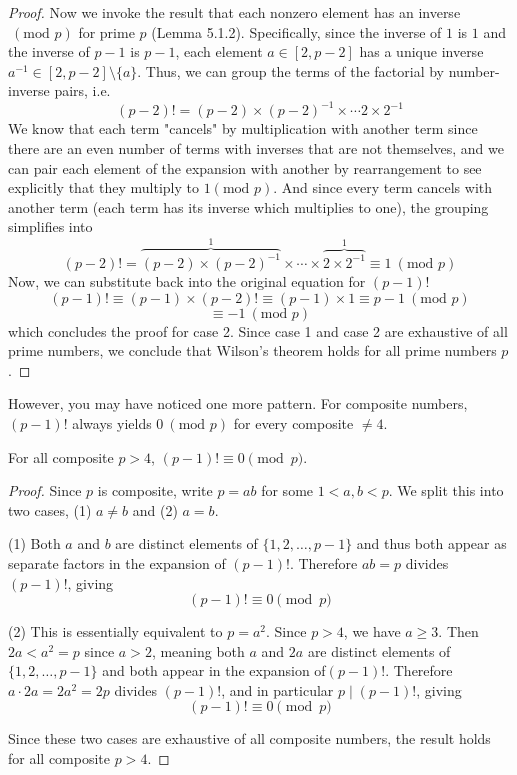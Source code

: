 \begin{proof}
Now we invoke the result that each nonzero element has an inverse $~(\text{mod }p)$ for prime $p$ (Lemma 5.1.2). Specifically, since the inverse of $1$ is $1$ and the inverse of $p-1$ is $p-1$, each element $a \in [2, p-2]$ has a unique inverse $a^{-1} \in [2, p-2] \setminus \{ a \}$. Thus, we can group the terms of the factorial by number-inverse pairs, i.e.
\[
(p-2)! = (p-2) \times (p-2)^{-1} \times \cdots 2 \times 2^{-1}
\]
We know that each term "cancels" by multiplication with another term since there are an even number of terms with inverses that are not themselves, and we can pair each element of the expansion with another by rearrangement to see explicitly that they multiply to $1 (\text{mod }p)$. And since every term cancels with another term (each term has its inverse which multiplies to one), the grouping simplifies into
\[
(p-2)! = \overbrace{(p-2) \times (p-2)^{-1}}^{1} \times \cdots \times \overbrace{2 \times 2^{-1}}^{1} \equiv 1 ~(\text{mod }p)
\]
Now, we can substitute back into the original equation for $(p-1)!$
\[
(p-1)! \equiv (p-1) \times (p-2)! \equiv (p-1) \times 1 \equiv p-1 ~(\text{mod }p)
\]
\[
\equiv -1 ~(\text{mod }p)
\]
which concludes the proof for case 2. Since case 1 and case 2 are exhaustive of all prime numbers, we conclude that Wilson's theorem holds for all prime numbers $p$.
\end{proof}

However, you may have noticed one more pattern. For composite numbers, $(p-1)!$ always yields $0 ~(\text{mod }p)$ for every composite $\neq 4$.

\begin{corollary}
For all composite $p > 4$, $(p-1)! \equiv 0 \pmod{p}$.
\end{corollary}
\begin{proof}
Since $p$ is composite, write $p = ab$ for some $1 < a, b < p$. 
We split this into two cases, (1) $a \neq b$ and (2) $a = b$. 

(1) Both $a$ and $b$ are distinct elements of $\{1, 2, \ldots, p-1\}$ and thus both appear as separate factors in the expansion of $(p-1)!$. Therefore $ab = p$ divides $(p-1)!$, giving \[(p-1)! \equiv 0 \pmod{p}\]

(2) This is essentially equivalent to $p = a^2$. Since $p > 4$, we have $a \geq 3$. Then $2a < a^2 = p$ since $a > 2$, meaning both $a$ and $2a$ are distinct elements of $\{1, 2, \ldots, p-1\}$  and both appear in the expansion of$(p-1)!$. Therefore $a \cdot 2a = 2a^2 = 2p$  divides $(p-1)!$, and in particular $p \mid (p-1)!$, giving \[(p-1)! \equiv 0 \pmod{p}\]

Since these two cases are exhaustive of all composite numbers, 
the result holds for all composite $p > 4$.
\end{proof}

